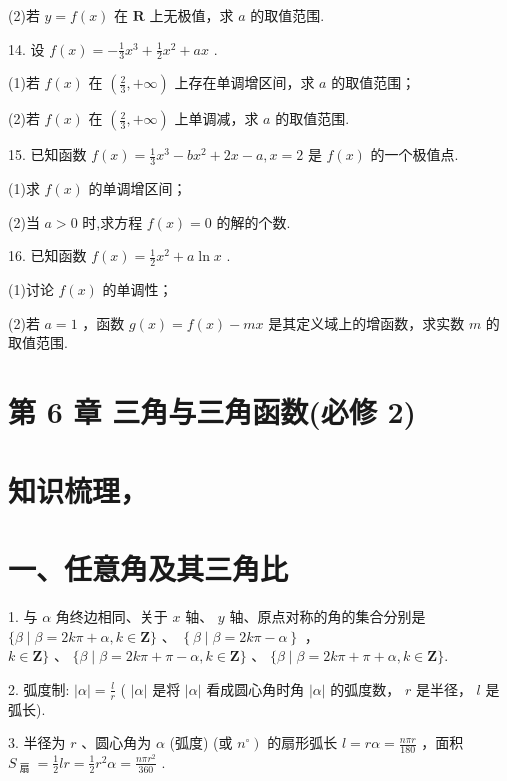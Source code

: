 (2)若 $y = f\left( x\right)$ 在 $\mathbf{R}$ 上无极值，求 $a$ 的取值范围.

14. 设 $f\left( x\right)  =  - \frac{1}{3}{x}^{3} + \frac{1}{2}{x}^{2} + {ax}$ .

(1)若 $f\left( x\right)$ 在 $\left( {\frac{2}{3}, + \infty }\right)$ 上存在单调增区间，求 $a$ 的取值范围；

(2)若 $f\left( x\right)$ 在 $\left( {\frac{2}{3}, + \infty }\right)$ 上单调减，求 $a$ 的取值范围.

15. 已知函数 $f\left( x\right)  = \frac{1}{3}{x}^{3} - b{x}^{2} + {2x} - a,x = 2$ 是 $f\left( x\right)$ 的一个极值点.

(1)求 $f\left( x\right)$ 的单调增区间；

(2)当 $a > 0$ 时,求方程 $f\left( x\right)  = 0$ 的解的个数.

16. 已知函数 $f\left( x\right)  = \frac{1}{2}{x}^{2} + a\ln x$ .

(1)讨论 $f\left( x\right)$ 的单调性；

(2)若 $a = 1$ ，函数 $g\left( x\right)  = f\left( x\right)  - {mx}$ 是其定义域上的增函数，求实数 $m$ 的取值范围.

\section*{第 6 章 三角与三角函数(必修 2)}

\section*{知识梳理，}

\section*{一、任意角及其三角比}

1. 与 $\alpha$ 角终边相同、关于 $x$ 轴、 $y$ 轴、原点对称的角的集合分别是 $\{ \beta  \mid  \beta  = {2k\pi } + \alpha ,k \in  \mathbf{Z}\}$ 、 $\left\{  {\beta  \mid  \beta  = {2k\pi } - \alpha }\right\}$ ， $k \in  \mathbf{Z}\} \text{ 、 }\{ \beta  \mid  \beta  = {2k\pi } + \pi  - \alpha ,k \in  \mathbf{Z}\} \text{ 、 }\{ \beta  \mid  \beta  = {2k\pi } + \pi  + \alpha ,k \in  \mathbf{Z}\} .$

2. 弧度制: $\left| \alpha \right|  = \frac{l}{r}$ ( $\left| \alpha \right|$ 是将 $\left| \alpha \right|$ 看成圆心角时角 $\left| \alpha \right|$ 的弧度数， $r$ 是半径， $l$ 是弧长).

3. 半径为 $r$ 、圆心角为 $\alpha$ (弧度) (或 $\left. {n}^{ \circ  }\right)$ 的扇形弧长 $l = {r\alpha } = \frac{n\pi r}{180}$ ，面积 ${S}_{\text{ 扇 }} = \frac{1}{2}{lr} = \frac{1}{2}{r}^{2}\alpha  = \frac{{n\pi }{r}^{2}}{360}$ .

